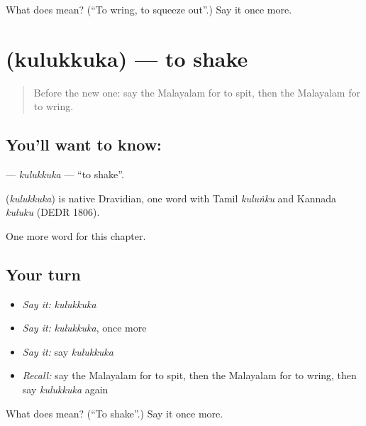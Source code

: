 \begin{tcolorbox}[breakable,colback=teal!4,colframe=teal!35!black,title={Before you move on}]
What does  mean? (\textquotedblleft{}To wring, to squeeze out\textquotedblright{}.) Say it once more.
\end{tcolorbox}
\section[\texorpdfstring{\ml{കുലുക്കുക} (kulukkuka)}{കുലുക്കുക (kulukkuka)}]{ (kulukkuka) — to shake}

\label{lesson:ML-C189-kulukkuka}



\begin{quote}
Before the new one: say the Malayalam for to spit, then the Malayalam for to wring.
\end{quote}

\subsection*{You'll want to know: }
\textbf{} — \emph{kulukkuka} — \textquotedblleft{}to shake\textquotedblright{}.

\begin{cousinweb}
\textbf{} (\emph{kulukkuka}) is native Dravidian, one word with Tamil \emph{kuluṅku} and Kannada \emph{kuluku} (DEDR 1806).
\end{cousinweb}

\begin{grammarlens}[title={What you've built}]
One more word for this chapter.
\end{grammarlens}

\subsection*{Your turn}
\begin{itemize}
\raggedright
  \item \emph{Say it:} \emph{kulukkuka}
  \item \emph{Say it:} \emph{kulukkuka}, once more
  \item \emph{Say it:} say \emph{kulukkuka}
  \item \emph{Recall:} say the Malayalam for to spit, then the Malayalam for to wring, then say \emph{kulukkuka} again
\end{itemize}

\begin{tcolorbox}[breakable,colback=teal!4,colframe=teal!35!black,title={Before you move on}]
What does  mean? (\textquotedblleft{}To shake\textquotedblright{}.) Say it once more.
\end{tcolorbox}
